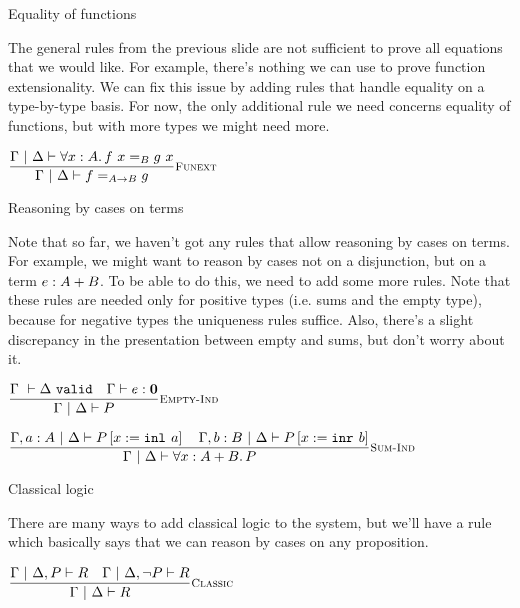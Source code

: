 \documentclass{beamer}
\begin{document}
\begin{frame}{Equality of functions}

The general rules from the previous slide are not sufficient to prove all equations that we would like. For example, there's nothing we can use to prove function extensionality. We can fix this issue by adding rules that handle equality on a type-by-type basis. For now, the only additional rule we need concerns equality of functions, but with more types we might need more.

\vspace{2em}

\begin{center}
  $\infrule[Funext]{\holds{\All{x}[A]{\Eq[B]{\app{f}{x}}{\app{g}{x}}}}}{\holds{\Eq[\Fun{A}{B}]{f}{g}}}$
\end{center}

\end{frame}

\begin{frame}{Reasoning by cases on terms}

Note that so far, we haven't got any rules that allow reasoning by cases on terms. For example, we might want to reason by cases not on a disjunction, but on a term $e : A + B$. To be able to do this, we need to add some more rules. Note that these rules are needed only for positive types (i.e. sums and the empty type), because for negative types the uniqueness rules suffice. Also, there's a slight discrepancy in the presentation between empty and sums, but don't worry about it.

\vspace{1em}

\begin{center}
  $\infrule[Empty-Ind]{\assctx{\Delta} \quad \typing{e}{\Empty}}{\holds{P}}$

  \vspace{2em}

  $\infrule[Sum-Ind]{\holds[\extend{\Gamma}{a}{A}][\Delta]{\subst{P}{x}{\inl{a}}} \quad \holds[\extend{\Gamma}{b}{B}][\Delta]{\subst{P}{x}{\inr{b}}}}{\holds{\All{x}[\Sum{A}{B}]{P}}}$
\end{center}

\end{frame}

\begin{frame}{Classical logic}

There are many ways to add classical logic to the system, but we'll have a rule which basically says that we can reason by cases on any proposition.

\vspace{2em}

\begin{center}
  $\infrule[Classic]{\holds[\Gamma][\assume{\Delta}{P}]{R} \quad \holds[\Gamma][\assume{\Delta}{\Not{P}}]{R}}{\holds{R}}$
\end{center}

\end{frame}
\end{document}

